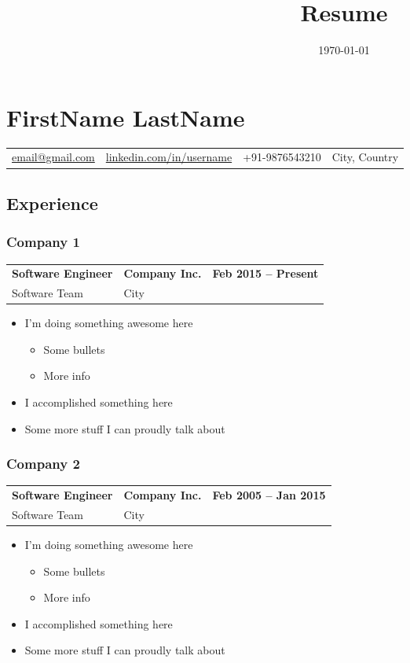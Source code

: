 \documentclass[letterpaper,10pt]{article}
\date{\today}
\title{Resume}
\begin{document}
\section*{FirstName LastName}
\label{sec:orgc246193}
\begin{center}
\begin{tabular}{c|c|c|c}
\href{mailto:email@gmail.com}{email@gmail.com} & \href{https://linkedin.com/in/username}{linkedin.com/in/username} & +91-9876543210 & City, Country\\
\end{tabular}
\end{center}
\subsection*{Experience}
\label{sec:orgbe60d0d}
\subsubsection*{Company 1}
\label{sec:orgfa118d2}
\begin{center}
\begin{tabular}{L{0.27\textwidth}C{0.40\textwidth}R{0.25\textwidth}}
\textbf{Software Engineer} & \textbf{Company Inc.} & \textbf{Feb 2015 -- Present}\\
Software Team & City & \\
\end{tabular}
\end{center}
\begin{itemize}
\item I'm doing something awesome here
\begin{itemize}
\item Some bullets
\item More info
\end{itemize}
\item I accomplished something here
\item Some more stuff I can proudly talk about
\end{itemize}
\subsubsection*{Company 2}
\label{sec:org0da8f88}
\begin{center}
\begin{tabular}{L{0.27\textwidth}C{0.40\textwidth}R{0.25\textwidth}}
\textbf{Software Engineer} & \textbf{Company Inc.} & \textbf{Feb 2005 -- Jan 2015}\\
Software Team & City & \\
\end{tabular}
\end{center}
\begin{itemize}
\item I'm doing something awesome here
\begin{itemize}
\item Some bullets
\item More info
\end{itemize}
\item I accomplished something here
\item Some more stuff I can proudly talk about
\end{itemize}
\end{document}
